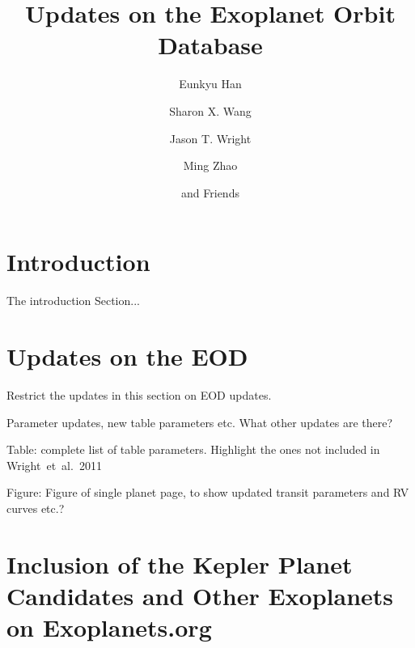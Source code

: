 \documentclass[11pt,preprint]{aastex}
\def\etal{~et~al.~}
\begin{document}
\begin{CJK*}{UTF8}{gbsn}

\title{Updates on the Exoplanet Orbit Database}

\author{Eunkyu Han}
\author{Sharon X. Wang}
\author{Jason T. Wright}
\author{Ming Zhao}
\author{and Friends}



\begin{abstract}

\end{abstract}  

\section{Introduction}\label{sec:intro}

The introduction Section...


\section{Updates on the EOD}\label{sec:update}

Restrict the updates in this section on EOD updates.

Parameter updates, new table parameters etc. What other updates are there?

Table: complete list of table parameters. Highlight the ones not
included in Wright\etal2011

Figure: Figure of single planet page, to show updated transit
parameters and RV curves etc.?

\section{Inclusion of the Kepler Planet Candidates and Other Exoplanets on Exoplanets.org}\label{sec:kepler}


\end{CJK*}
\end{document}
